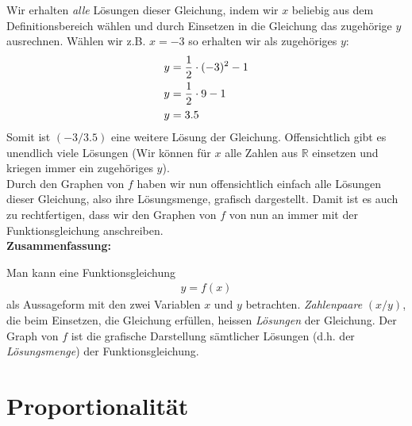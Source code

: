 \documentclass[11pt,oneside]{article}
\begin{document}
	Wir erhalten \emph{alle} Lösungen dieser Gleichung, indem wir $x$ beliebig aus dem Definitionsbereich wählen und durch Einsetzen in die Gleichung das zugehörige $y$ ausrechnen. Wählen wir z.B. $x=-3$ so erhalten wir als zugehöriges $y$:
	\begin{align*}
		y&=\frac{1}{2}\cdot(-3)^2-1\\
		y&=\frac{1}{2}\cdot 9 -1\\
		y&=3.5
	\end{align*}
	Somit ist $(-3/3.5)$ eine weitere Lösung der Gleichung. Offensichtlich gibt es unendlich viele Lösungen (Wir können für $x$ alle Zahlen aus $\mathbb{R}$ einsetzen und kriegen immer ein zugehöriges $y$).\\

	Durch den Graphen von $f$ haben wir nun offensichtlich einfach alle Lösungen dieser Gleichung, also ihre Lösungsmenge, grafisch dargestellt. Damit ist es auch zu rechtfertigen, dass wir den Graphen von $f$ von nun an immer mit der Funktionsgleichung anschreiben.\\

	\textbf{Zusammenfassung:}
	\begin{framed}
		\noindent Man kann eine Funktionsgleichung
		\begin{align*}
			y=f(x)
		\end{align*}
		als Aussageform mit den zwei Variablen $x$ und $y$ betrachten. \emph{Zahlenpaare} $(x/y)$, die beim Einsetzen, die Gleichung erfüllen, heissen \emph{Lösungen} der  Gleichung. Der Graph von $f$ ist die grafische Darstellung sämtlicher Lösungen (d.h. der \emph{Lösungsmenge}) der Funktionsgleichung.
	\end{framed}


\newpage
\section{Proportionalität}
\end{document}
